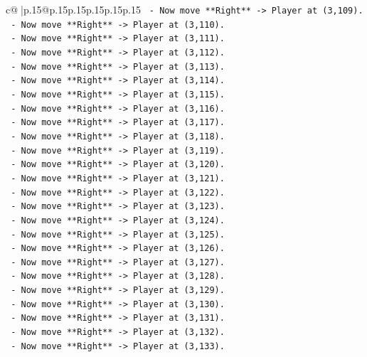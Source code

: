 \documentclass{article}
\begin{document}
{\begin{supertabular}{c@{$\;$}|p{.15\linewidth}@{}p{.15\linewidth}p{.15\linewidth}p{.15\linewidth}p{.15\linewidth}p{.15\linewidth}}
{{{\texttt{    {-}   Now move **Right** {-}> Player at (3,109).} \\
\texttt{    {-}   Now move **Right** {-}> Player at (3,110).} \\
\texttt{    {-}   Now move **Right** {-}> Player at (3,111).} \\
\texttt{    {-}   Now move **Right** {-}> Player at (3,112).} \\
\texttt{    {-}   Now move **Right** {-}> Player at (3,113).} \\
\texttt{    {-}   Now move **Right** {-}> Player at (3,114).} \\
\texttt{    {-}   Now move **Right** {-}> Player at (3,115).} \\
\texttt{    {-}   Now move **Right** {-}> Player at (3,116).} \\
\texttt{    {-}   Now move **Right** {-}> Player at (3,117).} \\
\texttt{    {-}   Now move **Right** {-}> Player at (3,118).} \\
\texttt{    {-}   Now move **Right** {-}> Player at (3,119).} \\
\texttt{    {-}   Now move **Right** {-}> Player at (3,120).} \\
\texttt{    {-}   Now move **Right** {-}> Player at (3,121).} \\
\texttt{    {-}   Now move **Right** {-}> Player at (3,122).} \\
\texttt{    {-}   Now move **Right** {-}> Player at (3,123).} \\
\texttt{    {-}   Now move **Right** {-}> Player at (3,124).} \\
\texttt{    {-}   Now move **Right** {-}> Player at (3,125).} \\
\texttt{    {-}   Now move **Right** {-}> Player at (3,126).} \\
\texttt{    {-}   Now move **Right** {-}> Player at (3,127).} \\
\texttt{    {-}   Now move **Right** {-}> Player at (3,128).} \\
\texttt{    {-}   Now move **Right** {-}> Player at (3,129).} \\
\texttt{    {-}   Now move **Right** {-}> Player at (3,130).} \\
\texttt{    {-}   Now move **Right** {-}> Player at (3,131).} \\
\texttt{    {-}   Now move **Right** {-}> Player at (3,132).} \\
\texttt{    {-}   Now move **Right** {-}> Player at (3,133).} \\
}}}
\end{supertabular}}
\end{document}
